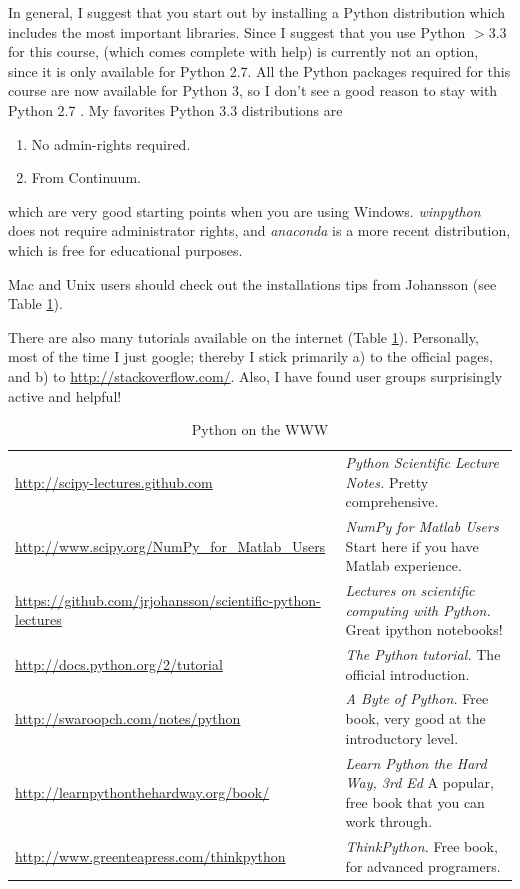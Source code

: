 In general, I suggest that you start out by installing a Python distribution which includes the most important libraries. Since I suggest that you use Python $>3.3$ for this course, \cite{pythonxy} (which comes complete with help) is currently not an option, since it is only available for Python 2.7. All the Python packages required for this course are now available for Python 3, so I don't see a good reason to stay with Python 2.7 . My favorites Python 3.3 distributions  are

\begin{enumerate}
    \item \cite{winpython} No admin-rights required.
    \item \cite{anaconda} From Continuum.
\end{enumerate}

which are very good starting points when you are using Windows. \emph{winpython} does not require administrator rights, and \emph{anaconda} is a more recent distribution, which is free for educational purposes.

Mac and Unix users should check out the installations tips from Johansson (see Table \ref{table:python}).

There are also many tutorials available on the internet (Table \ref{table:python}). Personally, most of the time I just google; thereby I stick primarily a) to the official pages, and b) to \url{http://stackoverflow.com/}. Also, I have found user groups surprisingly active and helpful!

\begin{table}

  \footnotesize{
  \centering
   \begin{tabular}{|l p{8 cm}|}
     \hline
     \url{http://scipy-lectures.github.com} & \emph{Python Scientific Lecture Notes.} Pretty comprehensive. \\     \url{http://www.scipy.org/NumPy\_for\_Matlab\_Users} & \emph{NumPy for Matlab Users} Start here if you have Matlab experience. \\
     \url {https://github.com/jrjohansson/scientific-python-lectures} & \emph{Lectures on scientific computing with Python.} Great ipython notebooks! \\     \url{http://docs.python.org/2/tutorial} & \emph{The Python tutorial.} The official introduction. \\
     \url{http://swaroopch.com/notes/python} & \emph{A Byte of Python.} Free book, very good at the introductory level. \\
     \url{http://learnpythonthehardway.org/book/} & \emph{Learn Python the Hard Way, 3rd Ed} A popular, free book that you can work through. \\
     \url{http://www.greenteapress.com/thinkpython} & \emph{ThinkPython.} Free book, for advanced programers. \\

     \hline
   \end{tabular}
   }
  \caption{Python on the WWW}\label{table:python}
\end{table}

